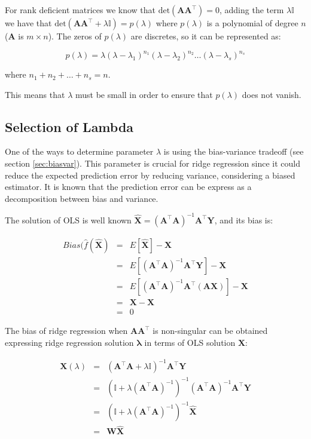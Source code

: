 For rank deficient matrices we know that $\text{det}(\mathbf{A A^\top})=0$, adding the
term $\lambda \mathbb{I}$ we have that $\text{det}(\mathbf{A A^\top}+\lambda \mathbb{I}) =
p(\lambda)$ where $p(\lambda)$ is a polynomial of degree $n$ ($\mathbf{A}$ is
$m \times n$). The zeros of $p(\lambda)$ are discretes, so it can be represented
as:

\[
p(\lambda) =
\lambda(\lambda-\lambda_1)^{n_1}(\lambda-\lambda_2)^{n_2}\dots(\lambda-\lambda_s)^{n_s}
\]

\noindent where $n_1 + n_2 + \dots + n_s = n$.

This means that $\lambda$ must be small in order to ensure that $p(\lambda)$
does not vanish.


\subsection{Selection of Lambda}

One of the ways to determine parameter $\lambda$ is using the bias-variance tradeoff (see section \ref{sec:biasvar}). This parameter is crucial for ridge regression since it could
reduce the expected prediction error by reducing variance, considering a biased
estimator. 
It is known that the prediction error can be express as a decomposition between bias and variance.

The solution of OLS is well known $\hat{\mathbf{X}}=(\mathbf{A}^\top \mathbf{A})^{-1}\mathbf{A}^\top \mathbf{Y}$, and its bias is:

\begin{eqnarray*}
Bias(\hat{f}(\hat{\mathbf{X}}) &=& E[\hat{\mathbf{X}}] - \mathbf{X} \\
&=& E[ (\mathbf{A}^\top \mathbf{A})^{-1}\mathbf{A}^\top \mathbf{Y}] - \mathbf{X} \\
&=& E[ (\mathbf{A}^\top \mathbf{A})^{-1}\mathbf{A}^\top (\mathbf{AX})] - \mathbf{X}  \\
&=& \mathbf{X}  - \mathbf{X}  \\
&=&  0
\end{eqnarray*}


The bias of ridge regression when $\mathbf{A A^\top}$ is non-singular
can be obtained expressing ridge regression solution
$\mathbf{\lambda}$ in terms of OLS solution $\hat{\mathbf{X}}$:

\begin{eqnarray*}
\mathbf{X}(\lambda) &=&( \mathbf{A}^\top \mathbf{A} + \lambda \mathbb{I})^{-1}\mathbf{A}^\top \mathbf{Y} \\
&=& (\mathbb{I} + \lambda (\mathbf{A}^\top \mathbf{A})^{-1})^{-1} (\mathbf{A}^\top \mathbf{A})^{-1}\mathbf{A}^\top \mathbf{Y} \\
&=&  (\mathbb{I} + \lambda (\mathbf{A}^\top \mathbf{A})^{-1})^{-1}  \hat{\mathbf{X}} \\
&=& \mathbf{W} \hat{\mathbf{X}} 
\end{eqnarray*}

